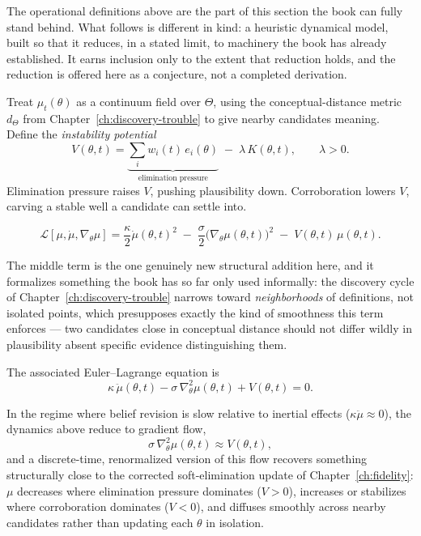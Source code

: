 \begin{optionalformal}
The operational definitions above are the part of this section the book can fully stand behind. What follows is different in kind: a heuristic dynamical model, built so that it reduces, in a stated limit, to machinery the book has already established. It earns inclusion only to the extent that reduction holds, and the reduction is offered here as a conjecture, not a completed derivation.

Treat $\mu_t(\theta)$ as a continuum field over $\Theta$, using the conceptual-distance metric $d_\Theta$ from Chapter~\ref{ch:discovery-trouble} to give nearby candidates meaning. Define the \emph{instability potential}
\[
V(\theta,t) = \underbrace{\sum_i w_i(t)\,e_i(\theta)}_{\text{elimination pressure}} \;-\; \lambda\, K(\theta,t), \qquad \lambda > 0.
\]
Elimination pressure raises $V$, pushing plausibility down. Corroboration lowers $V$, carving a stable well a candidate can settle into.

\begin{definition}
\[
\mathcal{L}[\mu,\dot\mu,\nabla_\theta\mu] = \frac{\kappa}{2}\dot\mu(\theta,t)^2 \;-\; \frac{\sigma}{2}\bigl(\nabla_\theta \mu(\theta,t)\bigr)^2 \;-\; V(\theta,t)\,\mu(\theta,t).
\]
\end{definition}

The middle term is the one genuinely new structural addition here, and it formalizes something the book has so far only used informally: the discovery cycle of Chapter~\ref{ch:discovery-trouble} narrows toward \emph{neighborhoods} of definitions, not isolated points, which presupposes exactly the kind of smoothness this term enforces --- two candidates close in conceptual distance should not differ wildly in plausibility absent specific evidence distinguishing them.

The associated Euler--Lagrange equation is
\[
\kappa\,\ddot\mu(\theta,t) - \sigma\,\nabla^2_\theta \mu(\theta,t) + V(\theta,t) = 0.
\]

\begin{conjecture}
In the regime where belief revision is slow relative to inertial effects ($\kappa\ddot\mu \approx 0$), the dynamics above reduce to gradient flow,
\[
\sigma\,\nabla^2_\theta \mu(\theta,t) \approx V(\theta,t),
\]
and a discrete-time, renormalized version of this flow recovers something structurally close to the corrected soft-elimination update of Chapter~\ref{ch:fidelity}: $\mu$ decreases where elimination pressure dominates ($V > 0$), increases or stabilizes where corroboration dominates ($V < 0$), and diffuses smoothly across nearby candidates rather than updating each $\theta$ in isolation.
\end{conjecture}


\end{optionalformal}
